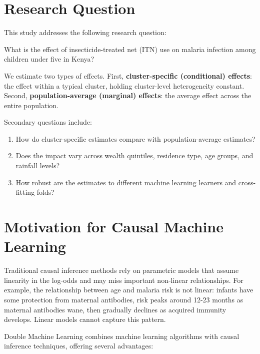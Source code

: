 \section{Research Question}

This study addresses the following research question:

\begin{pro}
	What is the effect of insecticide-treated net (ITN) use on malaria infection among children under five in Kenya?
\end{pro}

We estimate two types of effects. First, \textbf{cluster-specific (conditional) effects}: the effect within a typical cluster, holding cluster-level heterogeneity constant. Second, \textbf{population-average (marginal) effects}: the average effect across the entire population.

Secondary questions include:
\begin{enumerate}
	\item How do cluster-specific estimates compare with population-average estimates?
	\item Does the impact vary across wealth quintiles, residence type, age groups, and rainfall levels?
	\item How robust are the estimates to different machine learning learners and cross-fitting folds?
\end{enumerate}

\section{Motivation for Causal Machine Learning}

Traditional causal inference methods rely on parametric models that assume linearity in the log-odds and may miss important non-linear relationships. For example, the relationship between age and malaria risk is not linear: infants have some protection from maternal antibodies, risk peaks around 12-23 months as maternal antibodies wane, then gradually declines as acquired immunity develops. Linear models cannot capture this pattern.

Double Machine Learning \citep{chernozhukov2018double} combines machine learning algorithms with causal inference techniques, offering several advantages:

